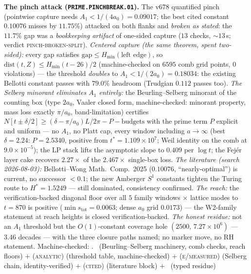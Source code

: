 \par\smallskip\noindent\textbf{The pinch attack
(\texttt{PRIME.PINCHBREAK.01}).}
The v678 quantified pinch (pointwise capture needs
$A_1<1/(4a_0)=0.09017$; the best cited constant $0.10076$ misses by
$11.75\%$) attacked on both flanks and \emph{broken as stated}: the
$11.7\%$ gap was a \emph{bookkeeping artifact} of one-sided capture
($13$ checks, ${\sim}13$\,s; verdict \textsc{pinch-broken-split}).
\emph{Centered capture (the same theorem, spent two-sided):} every
gap satisfies $\mathrm{gap}\le H_{\min}(\text{left edge})$, so
$\mathrm{dist}(t,Z)\le H_{\min}(t-26)/2$ (machine-checked on $6595$
comb grid points, $0$ violations) --- the threshold \emph{doubles} to
$A_1<1/(2a_0)=0.18034$: the existing Bellotti constant passes with
$79.0\%$ headroom (Trudgian $0.112$ passes too).  \emph{The Selberg
minorant eliminates $A_1$ entirely:} the Beurling--Selberg minorant
of the counting box (type $2a_0$, Vaaler closed form,
machine-checked: minorant property, mass loss exactly $\pi/a_0$,
band-limitation) certifies $N[t\pm\delta/2]\ge(\delta-\pi/a_0)L/2\pi
-P-\text{budgets}$ with the prime term $P$ explicit and uniform ---
no $A_1$, no Platt cap, every window including $a\to\infty$ (best
$\delta=2.24$: $P=2.5340$, positive from $t^*=1.109\times10^{7}$;
Weil identity on the comb at $9.0\times10^{-5}$); the LP stack lifts
the asymptotic slope to $0.409$ per $\log t$; the Fej\'er layer cake
recovers $2.27\times$ of the $2.467\times$ single-box loss.
\emph{The literature (search 2026-08-03):} Bellotti--Wong Math.\
Comp.\ 2025 ($0.10076$, ``nearly-optimal'') is current, no successor
$<0.1$; the new Amberger $S^1$ constants tighten the Turing route to
$H^*=1.5249$ --- still dominated, consistency confirmed.  \emph{The
reach:} the verification-backed diagonal floor over all $5$ family
windows $\times$ lattice modes to $t=870$ is positive ($\min
s_{\mathrm{tot}}=0.0063$; dense $a_0$ grid $0.0173$) --- the
W2-family statement at reach heights is closed verification-backed.
\emph{The honest residue:} not an $A_1$ threshold but the
$O(1)$-constant coverage hole $(2500,\,7.27\times10^{6})$ ---
$3.46$ decades --- with the three closure paths named; no marker
move, no RH statement.
Machine-checked: .
\mE\ (Beurling--Selberg machinery, comb checks, reach floors) $+$
(\textsc{analytic}) (threshold table, machine-checked) $+$
(\textsc{e/measured}) (Selberg chain, identity-verified) $+$
(\textsc{cited}) (literature block) $+$ \mC\ (typed residue)
\par\smallskip


